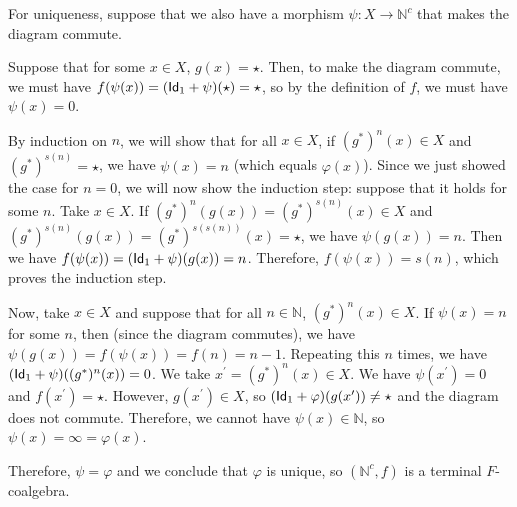 \begin{solution}
	For uniqueness, suppose that we also have a morphism $ \psi: X \to \mathbb N^c $ that makes the diagram commute.
	
	Suppose that for some $ x \in X $, $ g(x) = \star $. Then, to make the diagram commute, we must have $ f(\psi(x)) = (\Id[1] + \psi)(\star) = \star $, so by the definition of $ f $, we must have $ \psi(x) = 0 $.

	By induction on $ n $, we will show that for all $ x \in X $, if $ (g^*)^n(x) \in X $ and $ (g^*)^{s(n)} = \star $, we have $ \psi(x) = n $ (which equals $ \varphi(x) $). Since we just showed the case for $ n = 0 $, we will now show the induction step: suppose that it holds for some $ n $. Take $ x \in X $. If $ (g^*)^n(g(x)) = (g^*)^{s(n)}(x) \in X $ and $ (g^*)^{s(n)}(g(x)) = (g^*)^{s(s(n))}(x) = \star $, we have $ \psi(g(x)) = n $. Then we have $ f(\psi(x)) = (\Id[1] + \psi)(g(x)) = n $. Therefore, $ f(\psi(x)) = s(n) $, which proves the induction step.

	Now, take $ x \in X $ and suppose that for all $ n \in \mathbb N $, $ (g^*)^n(x) \in X $. If $ \psi(x) = n $ for some $ n $, then (since the diagram commutes), we have $ \psi(g(x)) = f(\psi(x)) = f(n) = n - 1 $. Repeating this $ n $ times, we have $ (\Id[1] + \psi)((g^*)^n(x)) = 0 $. We take $ x^\prime = (g^*)^n(x) \in X $. We have $ \psi(x^\prime) = 0 $ and $ f(x^\prime) = \star $. However, $ g(x^\prime) \in X $, so $ (\Id[1] + \varphi)(g(x^\prime)) \not = \star $ and the diagram does not commute. Therefore, we cannot have $ \psi(x) \in \mathbb N $, so $ \psi(x) = \infty = \varphi(x) $.

	Therefore, $ \psi = \varphi $ and we conclude that $ \varphi $ is unique, so $ (\mathbb N^c, f) $ is a terminal $ F $-coalgebra.
\end{solution}

